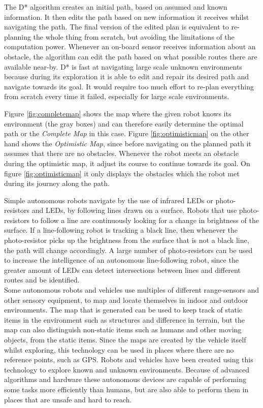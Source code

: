 The D* algorithm creates an initial path, based on assumed and known information. It then edits the path based on new information it receives whilst navigating the path. The final version of the edited plan is equivalent to re-planning the whole thing from scratch, but avoiding the limitations of the computation power.
Whenever an on-board sensor receives information about an obstacle, the algorithm can edit the path based on what possible routes there are available near-by.
D* is fast at navigating large scale unknown environments because during its exploration it is able to edit and repair its desired path and navigate towards its goal. It would require too much effort to re-plan everything from scratch every time it failed, especially for large scale environments\cite{dstar}\cite{moredstar}.

Figure \ref{fig:completemap} shows the map where the given robot knows its environment (the gray boxes) and can therefore easily determine the optimal path or the \textit{Complete Map} in this case. Figure \ref{fig:optimisticmap} on the other hand shows the \textit{Optimistic Map}, since before navigating on the planned path it assumes that there are no obstacles. Whenever the robot meets an obstacle during the optimistic map, it adjust its course to continue towards its goal. On figure \ref{fig:optimisticmap} it only displays the obstacles which the robot met during its journey  along the path.

Simple autonomous robots navigate by the use of infrared LEDs or photo-resistors and LEDs, by following lines drawn on a surface. Robots that use photo-resistors to follow a line are continuously looking for a change in brightness of the surface. If a line-following robot is tracking a black line, then whenever the photo-resistor picks up the brightness from the surface that is not a black line, the path will change accordingly. A large number of photo-resistors can be used to increase the intelligence of an autonomous line-following robot, since the greater amount of LEDs can detect intersections between lines and different routes and be identified\cite{linetrack}.\\
Some autonomous robots and vehicles use multiples of different range-sensors and other sensory equipment, to map and locate themselves in indoor and outdoor environments. The map that is generated can be used to keep track of static items in the environment such as structures and difference in terrain, but the map can also distinguish non-static items such as humans and other moving objects, from the static items. Since the maps are created by the vehicle itself whilst exploring, this technology can be used in places where there are no reference points, such as GPS\cite{rangesens}\cite{rangesensarc}. Robots and vehicles have been created using this technology to explore known and unknown environments. Because of advanced algorithms and hardware these autonomous devices are capable of performing some tasks more efficiently than humans, but are also able to perform them in places that are unsafe and hard to reach.

